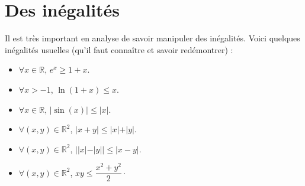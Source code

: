 \documentclass[french,11pt,twoside]{VcCours}
\begin{document}
\section{Des inégalités}

Il est très important en analyse de savoir manipuler des inégalités. Voici quelques inégalités usuelles (qu'il faut connaître et savoir redémontrer) : 

\begin{multicols}{2}
\begin{itemize}
\item $\forall x \in \mathbb{R}$, $e^x \geq 1+x$.
\item $\forall x > -1$, $\ln(1+x) \leq x$.
\item $\forall x \in \mathbb{R}$, $\vert \sin(x) \vert \leq \vert x \vert$.
\columnbreak
\item $\forall (x,y) \in \mathbb{R}^2$, $\vert x+y \vert \leq \vert x \vert + \vert y \vert$.
\item $\forall (x,y) \in \mathbb{R}^2$, $\vert \vert x \vert - \vert y \vert \vert \leq \vert x-y \vert$.
\item $\forall (x,y) \in \mathbb{R}^2$, $xy \leq \dfrac{x^2+y^2}{2}\cdot$
\end{itemize}
\end{multicols}
\end{document}
